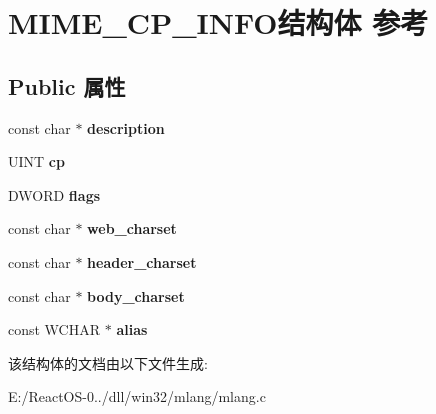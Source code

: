 \hypertarget{struct_m_i_m_e___c_p___i_n_f_o}{}\section{M\+I\+M\+E\+\_\+\+C\+P\+\_\+\+I\+N\+F\+O结构体 参考}
\label{struct_m_i_m_e___c_p___i_n_f_o}
\subsection*{Public 属性}
\begin{DoxyCompactItemize}
\item 
\mbox{\label{struct_m_i_m_e___c_p___i_n_f_o_acf758eedb2ff9ea62eee96f4d1623036}} 
const char $\ast$ {\bfseries description}
\item 
\mbox{\label{struct_m_i_m_e___c_p___i_n_f_o_a784c03a6ee12d35870849be121ed1076}} 
U\+I\+NT {\bfseries cp}
\item 
\mbox{\label{struct_m_i_m_e___c_p___i_n_f_o_acfe2f91630112891edba94678cb89acb}} 
D\+W\+O\+RD {\bfseries flags}
\item 
\mbox{\label{struct_m_i_m_e___c_p___i_n_f_o_af85b24f6a97977590a4f83686dc9c9cf}} 
const char $\ast$ {\bfseries web\+\_\+charset}
\item 
\mbox{\label{struct_m_i_m_e___c_p___i_n_f_o_a4d6dd945d5e8ccb4ec28ce9b5e8f0240}} 
const char $\ast$ {\bfseries header\+\_\+charset}
\item 
\mbox{\label{struct_m_i_m_e___c_p___i_n_f_o_aba5db4a10ee185b441a9f6d815e7d33c}} 
const char $\ast$ {\bfseries body\+\_\+charset}
\item 
\mbox{\label{struct_m_i_m_e___c_p___i_n_f_o_aae590d8043db4efbb5c73dbf92f123de}} 
const W\+C\+H\+AR $\ast$ {\bfseries alias}
\end{DoxyCompactItemize}


该结构体的文档由以下文件生成\+:\begin{DoxyCompactItemize}
\item 
E\+:/\+React\+O\+S-\/0../dll/win32/mlang/mlang.\+c\end{DoxyCompactItemize}
